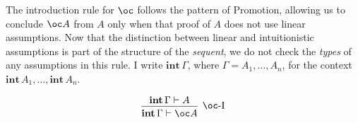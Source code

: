 The introduction rule for $\oc$ follows the pattern of Promotion, allowing us
to conclude $\oc A$ from $A$ only when that proof of $A$ does not use linear
assumptions.
Now that the distinction between linear and intuitionistic assumptions is part
of the structure of the \emph{sequent}, we do not check the \emph{types} of any
assumptions in this rule.
I write $\mathbf{int}\,\Gamma$, where $\Gamma = A_1, \ldots, A_n$, for the
context $\mathbf{int}\,A_1, \ldots, \mathbf{int}\,A_n$.

\[
  \begin{prooftree}
    \hypo{\mathbf{int}\,\Gamma \vdash A}
    \infer1[$\oc$-I]{\mathbf{int}\,\Gamma \vdash \oc A}
  \end{prooftree}
\]
